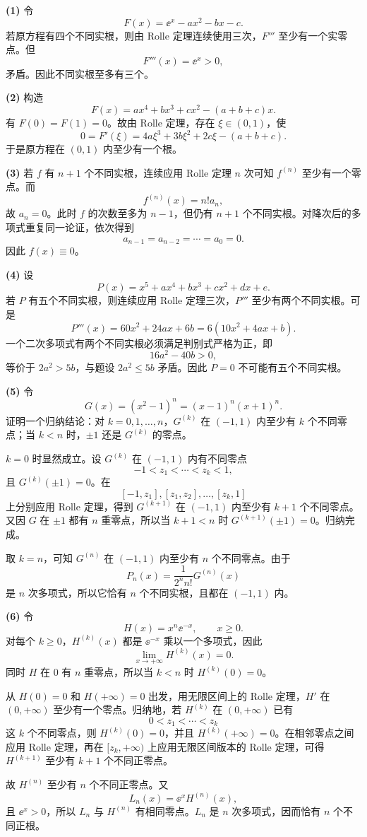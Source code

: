 \begin{xsolution}
\textbf{(1)}\quad
令
\[
  F(x)=\ee^x-ax^2-bx-c.
\]
若原方程有四个不同实根，则由 Rolle 定理连续使用三次，$F'''$ 至少有一个实零点。但
\[
  F'''(x)=\ee^x>0,
\]
矛盾。因此不同实根至多有三个。

\textbf{(2)}\quad
构造
\[
  F(x)=ax^4+bx^3+cx^2-(a+b+c)x.
\]
有 $F(0)=F(1)=0$。故由 Rolle 定理，存在 $\xi\in(0,1)$，使
\[
  0=F'(\xi)=4a\xi^3+3b\xi^2+2c\xi-(a+b+c).
\]
于是原方程在 $(0,1)$ 内至少有一个根。

\textbf{(3)}\quad
若 $f$ 有 $n+1$ 个不同实根，连续应用 Rolle 定理 $n$ 次可知 $f^{(n)}$ 至少有一个零点。而
\[
  f^{(n)}(x)=n!a_n,
\]
故 $a_n=0$。此时 $f$ 的次数至多为 $n-1$，但仍有 $n+1$ 个不同实根。对降次后的多项式重复同一论证，依次得到
\[
  a_{n-1}=a_{n-2}=\cdots=a_0=0.
\]
因此 $f(x)\equiv0$。

\textbf{(4)}\quad
设
\[
  P(x)=x^5+ax^4+bx^3+cx^2+dx+e.
\]
若 $P$ 有五个不同实根，则连续应用 Rolle 定理三次，$P'''$ 至少有两个不同实根。可是
\[
  P'''(x)=60x^2+24ax+6b=6(10x^2+4ax+b).
\]
一个二次多项式有两个不同实根必须满足判别式严格为正，即
\[
  16a^2-40b>0,
\]
等价于 $2a^2>5b$，与题设 $2a^2\leqslant5b$ 矛盾。因此 $P=0$ 不可能有五个不同实根。

\textbf{(5)}\quad
令
\[
  G(x)=(x^2-1)^n=(x-1)^n(x+1)^n.
\]
证明一个归纳结论：对 $k=0,1,\ldots,n$，$G^{(k)}$ 在 $(-1,1)$ 内至少有 $k$ 个不同零点；当 $k<n$ 时，$\pm1$ 还是 $G^{(k)}$ 的零点。

$k=0$ 时显然成立。设 $G^{(k)}$ 在 $(-1,1)$ 内有不同零点
\[
  -1<z_1<\cdots<z_k<1,
\]
且 $G^{(k)}(\pm1)=0$。在
\[
  [-1,z_1],[z_1,z_2],\ldots,[z_k,1]
\]
上分别应用 Rolle 定理，得到 $G^{(k+1)}$ 在 $(-1,1)$ 内至少有 $k+1$ 个不同零点。又因 $G$ 在 $\pm1$ 都有 $n$ 重零点，所以当 $k+1<n$ 时 $G^{(k+1)}(\pm1)=0$。归纳完成。

取 $k=n$，可知 $G^{(n)}$ 在 $(-1,1)$ 内至少有 $n$ 个不同零点。由于
\[
  P_n(x)=\frac{1}{2^n n!}G^{(n)}(x)
\]
是 $n$ 次多项式，所以它恰有 $n$ 个不同实根，且都在 $(-1,1)$ 内。

\textbf{(6)}\quad
令
\[
  H(x)=x^n\ee^{-x},\qquad x\geqslant0.
\]
对每个 $k\geqslant0$，$H^{(k)}(x)$ 都是 $\ee^{-x}$ 乘以一个多项式，因此
\[
  \lim_{x\to+\infty}H^{(k)}(x)=0.
\]
同时 $H$ 在 $0$ 有 $n$ 重零点，所以当 $k<n$ 时 $H^{(k)}(0)=0$。

从 $H(0)=0$ 和 $H(+\infty)=0$ 出发，用无限区间上的 Rolle 定理，$H'$ 在 $(0,+\infty)$ 至少有一个零点。归纳地，若 $H^{(k)}$ 在 $(0,+\infty)$ 已有
\[
  0<z_1<\cdots<z_k
\]
这 $k$ 个不同零点，则 $H^{(k)}(0)=0$，并且 $H^{(k)}(+\infty)=0$。在相邻零点之间应用 Rolle 定理，再在 $[z_k,+\infty)$ 上应用无限区间版本的 Rolle 定理，可得 $H^{(k+1)}$ 至少有 $k+1$ 个不同正零点。

故 $H^{(n)}$ 至少有 $n$ 个不同正零点。又
\[
  L_n(x)=\ee^x H^{(n)}(x),
\]
且 $\ee^x>0$，所以 $L_n$ 与 $H^{(n)}$ 有相同零点。$L_n$ 是 $n$ 次多项式，因而恰有 $n$ 个不同正根。
\end{xsolution}


